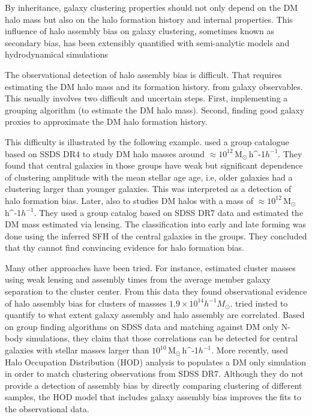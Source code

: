 \documentclass[fleqn,usenatbib]{mnras}
\newcommand{\Msunh}{\,{\rm M}$_{\odot}$\,\ifmmode h^{-1}\else $h^{-1}$\fi}
\begin{document}
By inheritance, galaxy clustering properties should not only depend on
the DM halo mass but also on the halo formation history and internal
properties.
This influence of halo assembly bias on galaxy clustering, sometimes known as
secondary bias, has been extensibly quantified with semi-analytic models 
\citep{2007MNRAS.374.1303C,2014ApJ...794...74J,2019MNRAS.484.1133C}
and hydrodynamical simulations \citep{2018MNRAS.480.3978A,2020MNRAS.tmp.1844M}

The observational detection of halo assembly bias is difficult.
That requires estimating the DM halo mass and its formation history.
from galaxy observables.
This usually involves two difficult and uncertain steps.
First, implementing a grouping algorithm (to estimate the DM halo
mass). 
Second, finding good galaxy proxies to approximate the DM halo
formation history.   

This difficulty is illustrated by the following example.
\citet{Lacerna_2014} used a group catalogue based on SSDS DR4
to study DM halo masses around $\approx 10^{12}$\Msunh. 
They found that central galaxies in those groups have weak but
significant dependence of clustering amplitude with the mean stellar
age age, i.e, older galaxies had a clustering larger than younger
galaxies. This was interpreted as a detection of halo formation bias.
Later, \citet{2016ApJ...819..119L} also to studies DM halos with a
mass of $\approx 10^{12}$\Msunh. 
They used a group catalog based on SDSS DR7 data  and estimated the DM
mass estimated via lensing.
The classification into early and late forming was done using  the
inferred SFH of the central galaxies in the groups.  
They concluded that thy cannot find convincing evidence for halo
formation bias.  


Many other approaches have been tried.
For instance, \citep{2016PhRvL.116d1301M} estimated cluster masses using weak lensing and
assembly times from the average member galaxy separation to the cluster center. 
From this data they found observational evidence of halo assembly bias
for clusters of massses $1.9\times 10^{14}h^{-1}M_\odot$.
\citep{2018MNRAS.478.4487T} tried insted to quantify to what extent
galaxy assembly and halo assembly are correlated.
Based on group finding algorithms on SDSS data and matching against DM only N-body simulations,
they claim that those correlations can be detected for central
galaxies with stellar masses larger than $10^{10}$\Msunh.
More recently, \citep{2019MNRAS.485.1196Z} used Halo Occupation
Distribution (HOD) analysis to populates a DM only simulation in order
to match clustering observations from SDSS DR7. 
Although they do not provide a detection of assembly bias by directly
comparing clustering of different samples, 
the HOD model that includes galaxy assembly bias improves the fits to
the observational data. 
\end{document}
